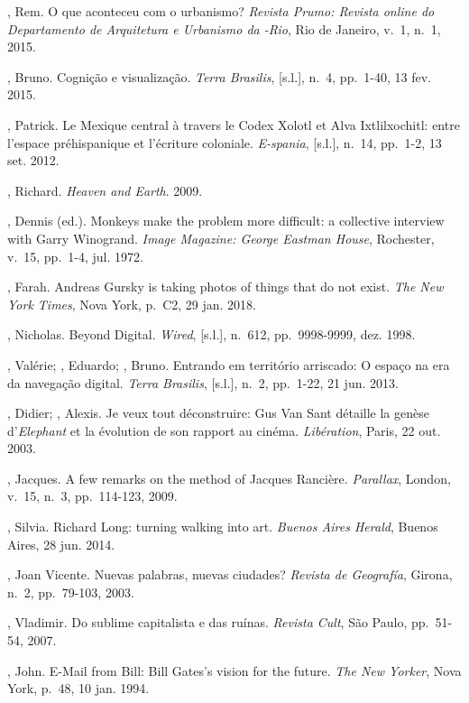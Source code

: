 \begin{Parskip}
, Rem. O que aconteceu com o urbanismo? \emph{Revista Prumo:
Revista online do Departamento de Arquitetura e Urbanismo da -Rio},
Rio de Janeiro, v.~1, n.~1, 2015.

, Bruno. Cognição e visualização. \emph{Terra Brasilis},
{[}s.l.{]}, n.~4, pp.~1-40, 13 fev. 2015.

, Patrick. Le Mexique central à travers le Codex Xolotl et Alva
Ixtlilxochitl: entre l'espace préhispanique et l'écriture coloniale.
\emph{E-spania}, {[}s.l.{]}, n.~14, pp.~1-2, 13 set. 2012. 

, Richard. \emph{Heaven and Earth}. 2009. 

, Dennis (ed.). Monkeys make the problem more difficult: a
collective interview with Garry Winogrand. \emph{Image Magazine:
George Eastman House}, Rochester, v.~15, pp.~1-4, jul. 1972.

, Farah. Andreas Gursky is taking photos of things that do not
exist. \emph{The New York Times}, Nova York, p.~C2, 29 jan. 2018.

, Nicholas. Beyond Digital. \emph{Wired}, {[}s.l.{]}, n.~612, pp.~9998-9999, dez. 1998.

, Valérie; , Eduardo; , Bruno. Entrando em
território arriscado: O espaço na era da navegação digital.
\emph{Terra Brasilis}, {[}s.l.{]}, n.~2, pp.~1-22, 21 jun. 2013. 

, Didier; , Alexis. Je veux tout déconstruire: Gus Van Sant
détaille la genèse d'\emph{Elephant} et la évolution de son rapport au
cinéma. \emph{Libération}, Paris, 22 out. 2003.

, Jacques. A few remarks on the method of Jacques Rancière.
\emph{Parallax}, London, v.~15, n.~3, pp.~114-123, 2009. 

, Silvia. Richard Long: turning walking into art.
\emph{Buenos Aires Herald}, Buenos Aires, 28 jun. 2014.

, Joan Vicente. Nuevas palabras, nuevas ciudades? \emph{Revista
de Geografía}, Girona, n.~2, pp.~79-103, 2003.

, Vladimir. Do sublime capitalista e das ruínas. \emph{Revista
Cult}, São Paulo, pp.~51-54, 2007.

, John. E-Mail from Bill: Bill Gates's vision for the future.
\emph{The New Yorker}, Nova York, p.~48, 10 jan. 1994.


\end{Parskip}
